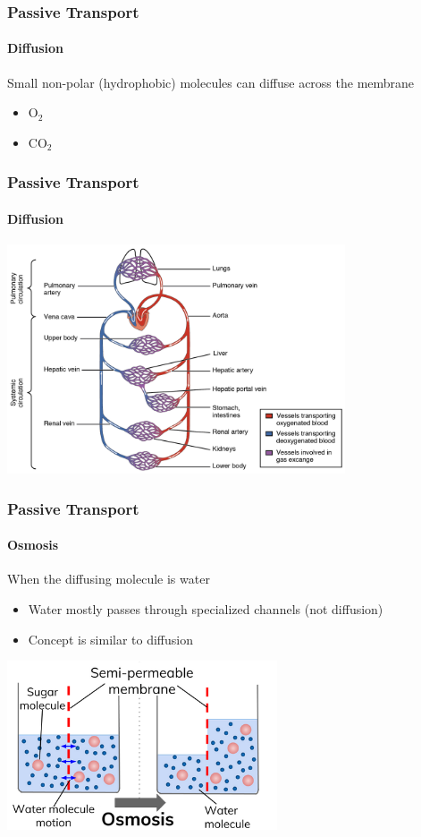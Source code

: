 \documentclass[10pt]{beamer}
\begin{document}
\begin{frame}[t]
\frametitle{Passive Transport}
\framesubtitle{Diffusion}
\vspace{0.5cm}

	Small non-polar (hydrophobic) molecules can diffuse across the membrane
		\medskip
		\begin{itemize}
			\item O$_{2}$
			\medskip
			\item CO$_{2}$
		\end{itemize}
\end{frame}


\begin{frame}
\frametitle{Passive Transport}
\framesubtitle{Diffusion}

	\begin{center}
		\includegraphics[width=0.75\textwidth]{figures/circulation.jpg}
	\end{center}	
\end{frame}


\begin{frame}[t]
\frametitle{Passive Transport}
\framesubtitle{Osmosis}

	When the diffusing molecule is water
		\medskip
		\begin{itemize}
			\item Water mostly passes through specialized channels (not diffusion)
			\medskip
			\item Concept is similar to diffusion
		\end{itemize}
	
		\begin{center}
			\includegraphics[width=0.6\textwidth]{figures/osmosis.png}
		\end{center}	
\end{frame}
\end{document}
